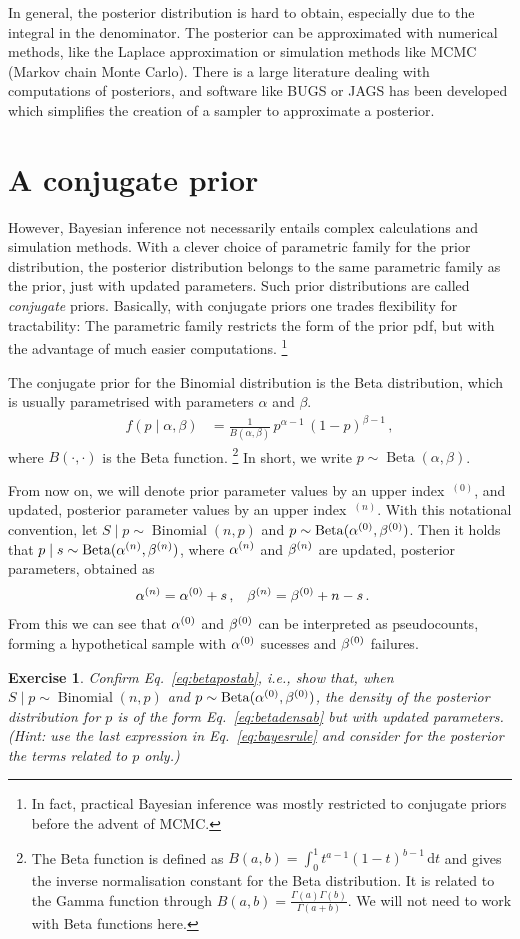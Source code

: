 \documentclass[12pt,a4paper	,twoside]{article}
\newcommand{\dd}{\,\mathrm{d}}
\newcommand{\uz}{^{(0)}} %
\newcommand{\un}{^{(n)}} %
\newcommand{\bin}{\operatorname{Binomial}}
\newcommand{\be}{\operatorname{Beta}}
\newtheorem{myex}{Exercise}
\begin{document}
In general, the posterior distribution is hard to obtain,
especially due to the integral in the denominator.
The posterior can be approximated with numerical methods,
like the Laplace approximation or simulation methods like MCMC (Markov chain Monte Carlo).
There is a large literature dealing with computations of posteriors,
and software like BUGS or JAGS has been developed
which simplifies the creation of a sampler to approximate a posterior.


\section{A conjugate prior}

However, Bayesian inference not necessarily entails complex calculations and simulation methods.
With a clever choice of parametric family for the prior distribution,
the posterior distribution belongs to the same parametric family as the prior,
just with updated parameters.
Such prior distributions are called \emph{conjugate} priors.
Basically, with conjugate priors one trades flexibility for tractability:
The parametric family restricts the form of the prior pdf,
but with the advantage of much easier computations.%
\footnote{In fact, practical Bayesian inference was mostly restricted to conjugate priors before the advent of MCMC.}

The conjugate prior for the Binomial distribution is the Beta distribution,
which is usually parametrised with parameters $\alpha$ and $\beta$.
\begin{align}
f(p\mid\alpha,\beta) &= \frac{1}{B(\alpha,\beta)}\, p^{\alpha-1}\, (1-p)^{\beta-1}\,,
\label{eq:betadensab}
\end{align}
where $B(\cdot,\cdot)$ is the Beta function.%
\footnote{The Beta function is defined as $B(a,b) = \int_0^1 t^{a-1} (1-t)^{b-1} \dd t$
and gives the inverse normalisation constant for the Beta distribution.
It is related to the Gamma function through $B(a,b) = \frac{\Gamma(a)\Gamma(b)}{\Gamma(a+b)}$.
We will not need to work with Beta functions here.}
In short, we write $p \sim \be(\alpha,\beta)$.

From now on, we will denote prior parameter values by an upper index~${}\uz$,
and updated, posterior parameter values by an upper index~${}\un$.
With this notational convention,
let $S\mid p \sim \bin(n,p)$ and $p \sim \be(\az,\bz)$.
Then it holds that $p \mid s \sim \be(\an,\bn)$,
where $\an$ and $\bn$ are updated, posterior parameters, obtained as
\begin{align}
\an &= \az + s\,, & \bn &= \bz + n - s \,.
\label{eq:betapostab}
\end{align}
From this we can see that $\az$ and $\bz$ can be interpreted as pseudocounts,
forming a hypothetical sample with $\az$ sucesses and $\bz$ failures.
\begin{myex}
Confirm Eq.~\eqref{eq:betapostab}, i.e.,
show that, when $S\mid p \sim \bin(n,p)$ and $p \sim \be(\az,\bz)$,
the density of the posterior distribution for $p$ is of the form Eq.~\eqref{eq:betadensab}
but with updated parameters.
(Hint: use the last expression in Eq.~\eqref{eq:bayesrule}
and consider for the posterior the terms related to $p$ only.)
\end{myex}
\end{document}

